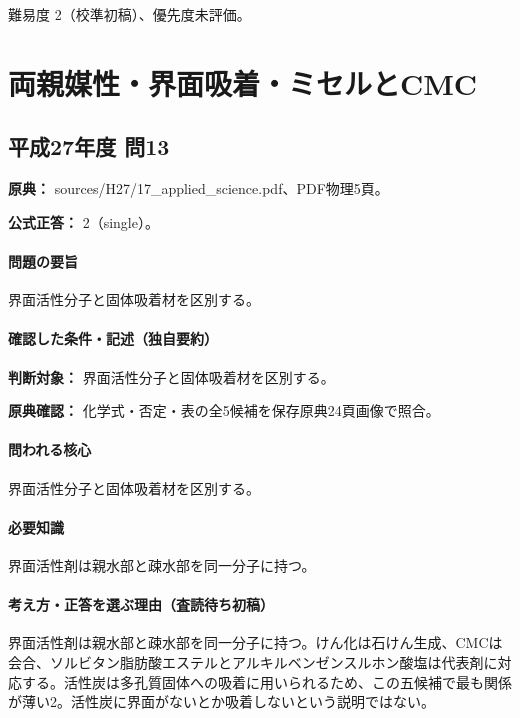\par 難易度 2（校準初稿）、優先度未評価。

\section{両親媒性・界面吸着・ミセルとCMC}

\subsection{平成27年度 問13}
\label{q:h27-reg-applied-13}

\noindent\textbf{原典：} sources/H27/17\_applied\_science.pdf、PDF物理5頁。

\textbf{公式正答：} 2（single）。

\paragraph{問題の要旨} 界面活性分子と固体吸着材を区別する。

\paragraph{確認した条件・記述（独自要約）}\mbox{}\par

\noindent\textbf{判断対象：} 界面活性分子と固体吸着材を区別する。\par

\noindent\textbf{原典確認：} 化学式・否定・表の全5候補を保存原典24頁画像で照合。\par

\paragraph{問われる核心} 界面活性分子と固体吸着材を区別する。

\paragraph{必要知識} 界面活性剤は親水部と疎水部を同一分子に持つ。

\paragraph{考え方・正答を選ぶ理由（査読待ち初稿）} 界面活性剤は親水部と疎水部を同一分子に持つ。けん化は石けん生成、CMCは会合、ソルビタン脂肪酸エステルとアルキルベンゼンスルホン酸塩は代表剤に対応する。活性炭は多孔質固体への吸着に用いられるため、この五候補で最も関係が薄い2。活性炭に界面がないとか吸着しないという説明ではない。

